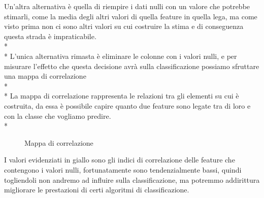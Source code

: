 Un’altra alternativa è quella di riempire i dati nulli con un valore che potrebbe stimarli, come la media degli altri valori di quella feature in quella lega, ma come visto prima non ci sono altri valori su cui costruire la stima e di conseguenza questa strada è impraticabile.\\*\\*
L’unica alternativa rimasta è eliminare le colonne con i valori nulli, e per misurare l’effetto che questa decisione avrà sulla classificazione possiamo sfruttare una mappa di correlazione\\*\\*
La mappa di correlazione rappresenta le relazioni tra gli elementi su cui è costruita, da essa è possibile capire quanto due feature sono legate tra di loro e con la classe che vogliamo predire.\\*
\begin{figure}[htp]
	\caption{Mappa di correlazione}
\end{figure}
\par
I valori evidenziati in giallo sono gli indici di correlazione delle feature che contengono i valori nulli, fortunatamente sono tendenzialmente bassi, quindi togliendoli non andremo ad influire sulla classificazione, ma potremmo addirittura migliorare le prestazioni di certi algoritmi di classificazione.
\clearpage

